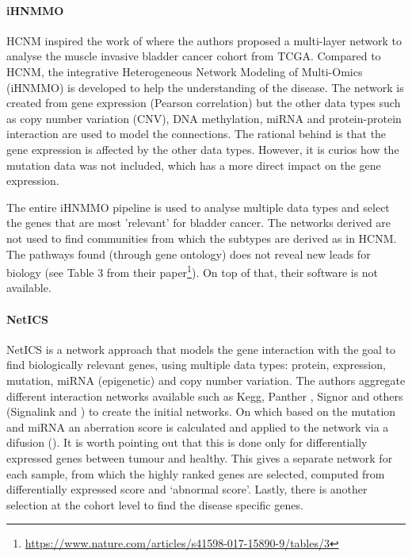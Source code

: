 \paragraph*{iHNMMO} \label{s:lit:iHNMMO}

HCNM inspired the work of \citet{Peng2017-ik} where the authors proposed a multi-layer network to analyse the muscle invasive bladder cancer cohort from TCGA. Compared to HCNM, the integrative Heterogeneous Network Modeling of Multi-Omics (iHNMMO) is developed to help the understanding of the disease. The network is created from gene expression (Pearson correlation) but the other data types such as copy number variation (CNV), DNA methylation, miRNA and protein-protein interaction are used to model the connections. The rational behind is that the gene expression is affected by the other data types. However, it is curios how the mutation data was not included, which has a more direct impact on the gene expression.

The entire iHNMMO pipeline is used to analyse multiple data types and select the genes that are most 'relevant' for bladder cancer. The networks derived are not used to find communities from which the subtypes are derived as in HCNM\cite{Vangimalla2021-fc, Care2019-ij}. The pathways found (through gene ontology) does not reveal new leads for biology (see Table 3 from their paper\footnote{\url{https://www.nature.com/articles/s41598-017-15890-9/tables/3}}). On top of that, their software is not available.

\paragraph*{NetICS} \label{s:lit:netICS}

NetICS \citet{Dimitrakopoulos2018-br} is a network approach that models the gene interaction with the goal to find biologically relevant genes, using multiple data types: protein, expression, mutation, miRNA (epigenetic) and copy number variation. The authors aggregate different interaction networks available such as Kegg\cite{Kanehisa2017-wj}, Panther \cite{Thomas2022-kn}, Signor \cite{Perfetto2016-tw} and others (Signalink\cite{Fazekas2013-qh} and \citet{Wu2010-ap}) to create the initial networks. On which based on the mutation and miRNA an aberration score is calculated and applied to the network via a difusion (\cite{Leiserson2015-kv}). It is worth pointing out that this is done only for differentially expressed genes between tumour and healthy. This gives a separate network for each sample, from which the highly ranked genes are selected, computed from differentially expressed score and ‘abnormal score’. Lastly, there is another selection at the cohort level to find the disease specific genes.

